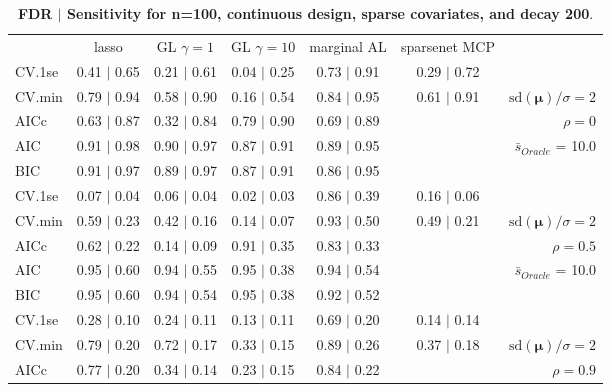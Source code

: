\begin{table}\vspace{-.5cm}
\caption[l]{ {\it }
{ \bf FDR $\boldsymbol{\mid}$ Sensitivity for n=100, continuous design, sparse covariates, and  decay  200}.}
\vspace{-.5cm}
\footnotesize{}
\begin{center}
\begin{tabular}{l*{5}{c}|r}
 & lasso & GL $\gamma=1$ & GL $\gamma=10$ & marginal AL & sparsenet MCP  & \\
 \cline{1-7}
CV.1se & 0.41 $\mid$ 0.65 & 0.21 $\mid$ 0.61 & 0.04 $\mid$ 0.25 & 0.73 $\mid$ 0.91 & 0.29 $\mid$ 0.72 & \\
CV.min & 0.79 $\mid$ 0.94 & 0.58 $\mid$ 0.90 & 0.16 $\mid$ 0.54 & 0.84 $\mid$ 0.95 & 0.61 $\mid$ 0.91 &  $\mathrm{sd}(\mathbf{\mu})/\sigma=2$ \\
AICc & 0.63 $\mid$ 0.87 & 0.32 $\mid$ 0.84 & 0.79 $\mid$ 0.90 & 0.69 $\mid$ 0.89 & & $\rho=0$ \\
AIC & 0.91 $\mid$ 0.98 & 0.90 $\mid$ 0.97 & 0.87 $\mid$ 0.91 & 0.89 $\mid$ 0.95 & &  \multirow{2}{*}{$\bar{s}_{Oracle}$ = 10.0} \\
BIC & 0.91 $\mid$ 0.97 & 0.89 $\mid$ 0.97 & 0.87 $\mid$ 0.91 & 0.86 $\mid$ 0.95 & &  \\
 \hline 
CV.1se & 0.07 $\mid$ 0.04 & 0.06 $\mid$ 0.04 & 0.02 $\mid$ 0.03 & 0.86 $\mid$ 0.39 & 0.16 $\mid$ 0.06 & \\
CV.min & 0.59 $\mid$ 0.23 & 0.42 $\mid$ 0.16 & 0.14 $\mid$ 0.07 & 0.93 $\mid$ 0.50 & 0.49 $\mid$ 0.21 &  $\mathrm{sd}(\mathbf{\mu})/\sigma=2$ \\
AICc & 0.62 $\mid$ 0.22 & 0.14 $\mid$ 0.09 & 0.91 $\mid$ 0.35 & 0.83 $\mid$ 0.33 & & $\rho=0.5$ \\
AIC & 0.95 $\mid$ 0.60 & 0.94 $\mid$ 0.55 & 0.95 $\mid$ 0.38 & 0.94 $\mid$ 0.54 & &  \multirow{2}{*}{$\bar{s}_{Oracle}$ = 10.0} \\
BIC & 0.95 $\mid$ 0.60 & 0.94 $\mid$ 0.54 & 0.95 $\mid$ 0.38 & 0.92 $\mid$ 0.52 & &  \\
 \hline 
CV.1se & 0.28 $\mid$ 0.10 & 0.24 $\mid$ 0.11 & 0.13 $\mid$ 0.11 & 0.69 $\mid$ 0.20 & 0.14 $\mid$ 0.14 & \\
CV.min & 0.79 $\mid$ 0.20 & 0.72 $\mid$ 0.17 & 0.33 $\mid$ 0.15 & 0.89 $\mid$ 0.26 & 0.37 $\mid$ 0.18 &  $\mathrm{sd}(\mathbf{\mu})/\sigma=2$ \\
AICc & 0.77 $\mid$ 0.20 & 0.34 $\mid$ 0.14 & 0.23 $\mid$ 0.15 & 0.84 $\mid$ 0.22 & & $\rho=0.9$ \\

\end{tabular}
\end{center}
\end{table}
